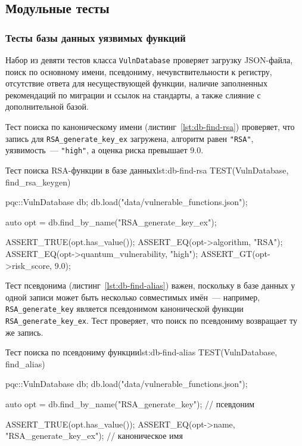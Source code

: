 \subsection{Модульные тесты}

\subsubsection{Тесты базы данных уязвимых функций}

Набор из девяти тестов класса \texttt{VulnDatabase} проверяет загрузку
JSON-файла, поиск по основному имени, псевдониму, нечувствительности
к регистру, отсутствие ответа для несуществующей функции, наличие
заполненных рекомендаций по миграции и ссылок на стандарты, а
также слияние с дополнительной базой.

Тест поиска по каноническому имени (листинг~\ref{lst:db-find-rsa})
проверяет, что запись для \texttt{RSA\_generate\_key\_ex} загружена,
алгоритм равен \texttt{"RSA"}, уязвимость~--- \texttt{"high"}, а оценка
риска превышает 9.0.

\begin{itmolisting}[C++]{Тест поиска RSA-функции в базе данных}{lst:db-find-rsa}
TEST(VulnDatabase, find_rsa_keygen) {
    pqc::VulnDatabase db;
    db.load("data/vulnerable_functions.json");

    auto opt = db.find_by_name("RSA_generate_key_ex");

    ASSERT_TRUE(opt.has_value());
    ASSERT_EQ(opt->algorithm, "RSA");
    ASSERT_EQ(opt->quantum_vulnerability, "high");
    ASSERT_GT(opt->risk_score, 9.0);
}
\end{itmolisting}

Тест псевдонима (листинг~\ref{lst:db-find-alias}) важен, поскольку
в базе данных у одной записи может быть несколько совместимых имён~---
например, \texttt{RSA\_generate\_key} является псевдонимом канонической
функции \texttt{RSA\_generate\_key\_ex}.
Тест проверяет, что поиск по псевдониму возвращает ту же запись.

\begin{itmolisting}[C++]{Тест поиска по псевдониму функции}{lst:db-find-alias}
TEST(VulnDatabase, find_alias) {
    pqc::VulnDatabase db;
    db.load("data/vulnerable_functions.json");

    auto opt = db.find_by_name("RSA_generate_key"); // псевдоним

    ASSERT_TRUE(opt.has_value());
    ASSERT_EQ(opt->name, "RSA_generate_key_ex");    // каноническое имя
}
\end{itmolisting}

